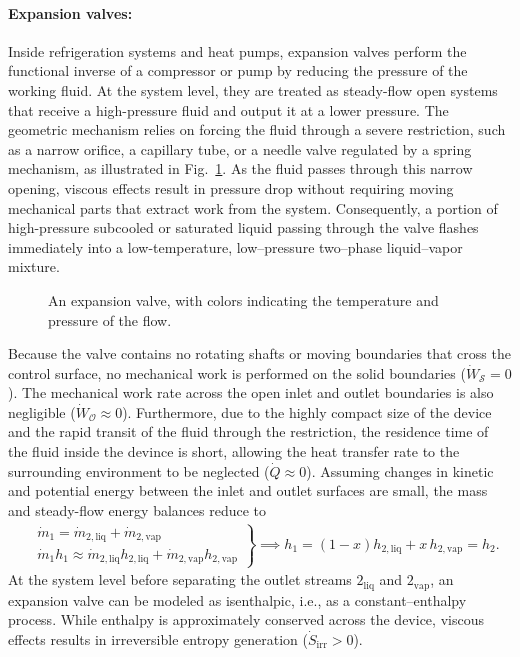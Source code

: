 \paragraph{Expansion valves:} Inside refrigeration systems and heat pumps, expansion valves perform the functional inverse of a compressor or pump by reducing the pressure of the working fluid. At the system level, they are treated as steady-flow open systems that receive a high-pressure fluid and output it at a lower pressure. The geometric mechanism relies on forcing the fluid through a severe restriction, such as a narrow orifice, a capillary tube, or a needle valve regulated by a spring mechanism, as illustrated in Fig.~\ref{fig:expansion-valve}. As the fluid passes through this narrow opening, viscous effects result in pressure drop without requiring moving mechanical parts that extract work from the system. Consequently, a portion of high-pressure subcooled or saturated liquid passing through the valve flashes immediately into a low-temperature, low--pressure two--phase liquid--vapor mixture.
\begin{figure}[!htb]
    \centering
    
    \caption{An expansion valve, with colors indicating the temperature and pressure of the flow.}
    \label{fig:expansion-valve}
\end{figure}

Because the valve contains no rotating shafts or moving boundaries that cross the control surface, no mechanical work is performed on the solid boundaries ($\dot{W}_\mathcal{S} = 0$). The mechanical work rate across the open inlet and outlet boundaries is also negligible ($\dot{W}_\mathcal{O} \approx 0$). Furthermore, due to the highly compact size of the device and the rapid transit of the fluid through the restriction, the residence time of the fluid inside the devince is short, allowing the heat transfer rate to the surrounding environment to be neglected ($\dot{Q} \approx 0$). Assuming changes in kinetic and potential energy between the inlet and outlet surfaces are small, the mass and steady-flow energy balances reduce to
\begin{align}
    \left.\begin{aligned}
        &\dot{m}_1=\dot{m}_{2,\text{liq}}+\dot{m}_{2,\text{vap}}\\
    &\dot{m}_1h_1\approx \dot{m}_{2,\text{liq}}h_{2,\text{liq}}+\dot{m}_{2,\text{vap}}h_{2,\text{vap}}
    \end{aligned}\right\} \implies h_1=(1-x)h_{2,\text{liq}}+x\,h_{2,\text{vap}}=h_2.
\end{align}
At the system level before separating the outlet streams $2_\text{liq}$ and $2_\text{vap}$, an expansion valve can be modeled as isenthalpic, i.e., as a constant--enthalpy process.  While enthalpy is approximately conserved across the device, viscous effects results in irreversible entropy generation ($\dot{S}_\text{irr} > 0$). 

